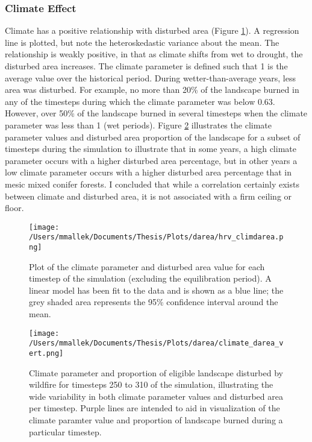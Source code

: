 
\subsubsection*{Climate Effect} 
Climate has a positive relationship with disturbed area (Figure \ref{fig:climate_darea}). A regression line is plotted, but note the heteroskedastic variance about the mean. The relationship is weakly positive, in that as climate shifts from wet to drought, the disturbed area increases. The climate parameter is defined such that 1 is the average value over the historical period. During wetter-than-average years, less area was disturbed. For example, no more than 20\% of the landscape burned in any of the timesteps during which the climate parameter was below 0.63. However, over 50\% of the landscape burned in several timesteps when the climate parameter was less than 1 (wet periods). Figure \ref{fig:compare_clim_darea} illustrates the climate parameter values and disturbed area proportion of the landscape for a subset of timesteps during the simulation to illustrate that in some years, a high climate parameter occurs with a higher disturbed area percentage, but in other years a low climate parameter occurs with a higher disturbed area percentage that in mesic mixed conifer forests. I concluded that while a correlation certainly exists between climate and disturbed area, it is not associated with a firm ceiling or floor.

\begin{figure}[!htbp]
  \centering
    \texttt{[image: /Users/mmallek/Documents/Thesis/Plots/darea/hrv\_climdarea.png]}
  \caption{Plot of the climate parameter and disturbed area value for each timestep of the simulation (excluding the equilibration period). A linear model has been fit to the data and is shown as a blue line; the grey shaded area represents the 95\% confidence interval around the mean.}
  \label{fig:climate_darea}
\end{figure}


\begin{figure}[!htbp]
\centering
\texttt{[image: /Users/mmallek/Documents/Thesis/Plots/darea/climate\_darea\_vert.png]}
\caption{Climate parameter and proportion of eligible landscape disturbed by wildfire for timesteps 250 to 310 of the simulation, illustrating the wide variability in both climate parameter values and disturbed area per timestep. Purple lines are intended to aid in visualization of the climate paramter value and proportion of landscape burned during a particular timestep.}
\label{fig:compare_clim_darea}
\end{figure}

